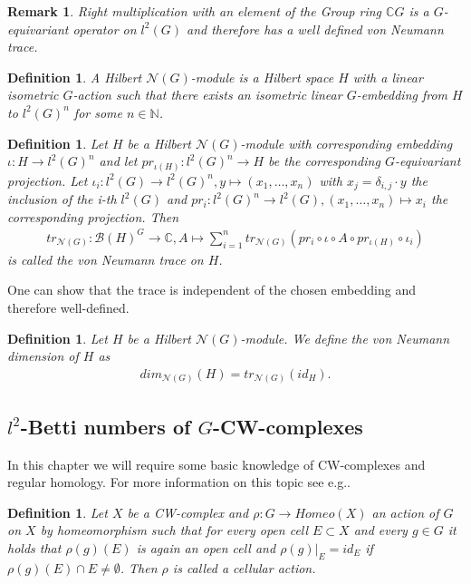 \documentclass[12pt,a4paper]{scrartcl}
\newtheorem{Definition}[Theorem]{Definition}
\newtheorem{Remark}[Theorem]{Remark}
\numberwithin{equation}{section}
\newcommand{\C}{\mathbb{C}} %
\newcommand{\N}{\mathbb{N}} %
\newcommand{\2}{\mathbb{Z} / 2 \mathbb{Z}}
\newcommand{\1}{\bar{1}}
\newcommand{\0}{\bar{0}}
\begin{document}
\begin{Remark}
	Right multiplication with an element of the Group ring $\C G$ is a $G$-equivariant operator on $l^2(G)$ and therefore has a well defined von Neumann trace.
\end{Remark}
\begin{Definition}
	A Hilbert $\mathcal{N}(G)$-module is a Hilbert space $H$ with a linear isometric $G$-action such that there exists an isometric linear $G$-embedding from $H$ to $l^2(G)^n$ for some $n \in \N$.
\end{Definition}
\begin{Definition}
	Let $H$ be a Hilbert $\mathcal{N}(G)$-module with corresponding embedding $\iota: H \to l^2(G)^n$ and let $pr_{\iota(H)}: l^2(G)^n \to H$ be the corresponding $G$-equivariant projection. Let $\iota_i: l^2(G) \to l^2(G)^n, y \mapsto (x_1, \ldots, x_n)$ with $x_j = \delta_{i,j} \cdot y$ the inclusion of the i-th $l^2(G)$ and $pr_i: l^2(G)^n \to l^2(G), (x_1, \ldots, x_n) \mapsto x_i$ the corresponding projection. Then 
	\begin{align*}
		tr_{\mathcal{N}(G)}: \mathcal{B}(H)^G \to \C, A \mapsto \sum_{i = 1}^{n} tr_{\mathcal{N}(G)}(pr_i \circ \iota \circ A \circ pr_{\iota(H)} \circ \iota_i)
	\end{align*}
	is called the von Neumann trace on $H$.
\end{Definition}
One can show that the trace is independent of the chosen embedding and therefore well-defined.  
\begin{Definition}
	Let $H$ be a Hilbert $\mathcal{N}(G)$-module. We define the von Neumann dimension of $H$ as
	\begin{align*}
		dim_{\mathcal{N}(G)}(H) = tr_{\mathcal{N}(G)}(id_H).
	\end{align*}
\end{Definition}

\subsection{$l^2$-Betti numbers of $G$-CW-complexes}
In this chapter we will require some basic knowledge of CW-complexes and regular homology. For more information on this topic see e.g.\cite{HATCH}.
\begin{Definition}
	Let $X$ be a CW-complex and $\rho: G \to Homeo(X)$ an action of $G$ on $X$ by homeomorphism such that for every open cell $E \subset X$ and every $g \in G$ it holds that $\rho(g)(E)$ is again an open cell and $\rho(g)|_{E} = id_E$ if $\rho(g)(E) \cap E \neq \emptyset$. Then $\rho$ is called a cellular action.
\end{Definition}
\end{document}
